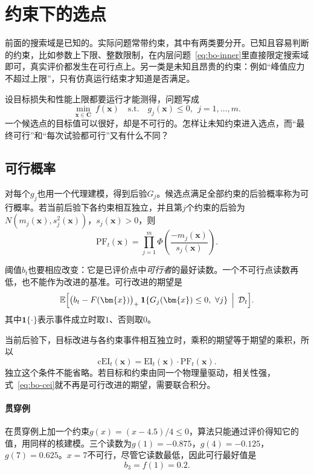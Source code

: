 \section{约束下的选点}
\label{sec:bo-constraints}

前面的搜索域是已知的。实际问题常带约束，其中有两类要分开。已知且容易判断的约束，比如参数上下限、整数限制，在内层问题~\eqref{eq:bo-inner}里直接限定搜索域即可，真实评价都发生在可行点上。另一类是未知且昂贵的约束：例如“峰值应力不超过上限”，只有仿真运行结束才知道是否满足。

设目标损失和性能上限都要运行才能测得，问题写成
\begin{equation}
 \min_{\bm{x}\in\bm{C}}\ f(\bm{x})\quad\text{s.t.}\quad g_j(\bm{x})\leq0,\ \ j=1,\ldots,m.
 \label{eq:bo-constrained}
\end{equation}
一个候选点的目标值可以很好，却是不可行的。怎样让未知约束进入选点，而“最终可行”和“每次试验都可行”又有什么不同？

\subsection{可行概率}
\label{sec:bo-feasibility}

对每个$g_j$也用一个代理建模，得到后验$G_j$。候选点满足全部约束的后验概率称为可行概率。若当前后验下各约束相互独立，并且第$j$个约束的后验为$N(m_j(\bm{x}),s_j^2(\bm{x}))$，$s_j(\bm{x})>0$，则
\begin{equation}
 \mathrm{PF}_t(\bm{x})=\prod_{j=1}^m\Phi\left(\frac{-m_j(\bm{x})}{s_j(\bm{x})}\right).
 \label{eq:bo-feasible-prob}
\end{equation}

阈值$b_t$也要相应改变：它是已评价点中\emph{可行者}的最好读数。一个不可行点读数再低，也不能作为改进的基准。可行改进的期望是
\[
 \mathbb{E}\Bigl[\bigl(b_t-F(\bm{x})\bigr)_+\,\mathbf{1}\{G_j(\bm{x})\leq0,\ \forall j\}\,\Bigm|\,\mathcal{D}_t\Bigr].
\]
其中$\mathbf{1}\{\cdot\}$表示事件成立时取$1$、否则取$0$。

当前后验下，目标改进与各约束事件相互独立时，乘积的期望等于期望的乘积，所以
\begin{equation}
 \mathrm{cEI}_t(\bm{x})=\mathrm{EI}_t(\bm{x})\cdot\mathrm{PF}_t(\bm{x}).
 \label{eq:bo-cei}
\end{equation}
独立这个条件不能省略。若目标和约束由同一个物理量驱动，相关性强，式~\eqref{eq:bo-cei}就不再是可行改进的期望，需要联合积分。

\paragraph{贯穿例}
在贯穿例上加一个约束$g(x)=(x-4.5)/4\leq0$，算法只能通过评价得知它的值，用同样的核建模。三个读数为$g(1)=-0.875$，$g(4)=-0.125$，$g(7)=0.625$。$x=7$不可行，尽管它读数最低，因此可行最好值是
\[
 b_3=f(1)=0.2.
\]

